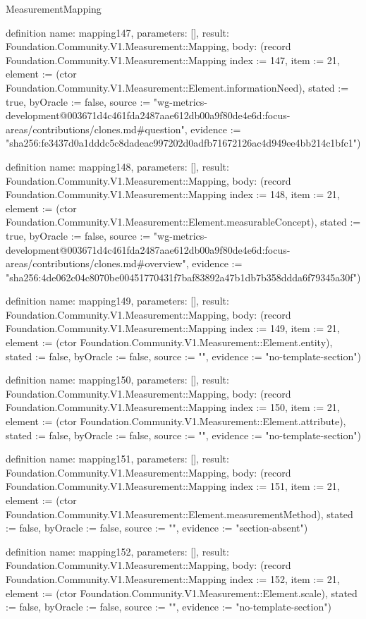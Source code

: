 \begin{lexlean}{MeasurementMapping}
\begin{semanticmodule}
definition{
  name: mapping147,
  parameters: [],
  result: Foundation.Community.V1.Measurement::Mapping,
  body: (record Foundation.Community.V1.Measurement::Mapping {index := 147, item := 21, element := (ctor Foundation.Community.V1.Measurement::Element.informationNeed), stated := true, byOracle := false, source := "wg-metrics-development@003671d4c461fda2487aae612db00a9f80de4e6d:focus-areas/contributions/clones.md#question", evidence := "sha256:fe3437d0a1dddc5c8dadeac997202d0adfb71672126ac4d949ee4bb214c1bfc1"})
}

definition{
  name: mapping148,
  parameters: [],
  result: Foundation.Community.V1.Measurement::Mapping,
  body: (record Foundation.Community.V1.Measurement::Mapping {index := 148, item := 21, element := (ctor Foundation.Community.V1.Measurement::Element.measurableConcept), stated := true, byOracle := false, source := "wg-metrics-development@003671d4c461fda2487aae612db00a9f80de4e6d:focus-areas/contributions/clones.md#overview", evidence := "sha256:4de062c04c8070be00451770431f7baf83892a47b1db7b358ddda6f79345a30f"})
}

definition{
  name: mapping149,
  parameters: [],
  result: Foundation.Community.V1.Measurement::Mapping,
  body: (record Foundation.Community.V1.Measurement::Mapping {index := 149, item := 21, element := (ctor Foundation.Community.V1.Measurement::Element.entity), stated := false, byOracle := false, source := "", evidence := "no-template-section"})
}

definition{
  name: mapping150,
  parameters: [],
  result: Foundation.Community.V1.Measurement::Mapping,
  body: (record Foundation.Community.V1.Measurement::Mapping {index := 150, item := 21, element := (ctor Foundation.Community.V1.Measurement::Element.attribute), stated := false, byOracle := false, source := "", evidence := "no-template-section"})
}

definition{
  name: mapping151,
  parameters: [],
  result: Foundation.Community.V1.Measurement::Mapping,
  body: (record Foundation.Community.V1.Measurement::Mapping {index := 151, item := 21, element := (ctor Foundation.Community.V1.Measurement::Element.measurementMethod), stated := false, byOracle := false, source := "", evidence := "section-absent"})
}

definition{
  name: mapping152,
  parameters: [],
  result: Foundation.Community.V1.Measurement::Mapping,
  body: (record Foundation.Community.V1.Measurement::Mapping {index := 152, item := 21, element := (ctor Foundation.Community.V1.Measurement::Element.scale), stated := false, byOracle := false, source := "", evidence := "no-template-section"})
}


\end{semanticmodule}
\end{lexlean}
